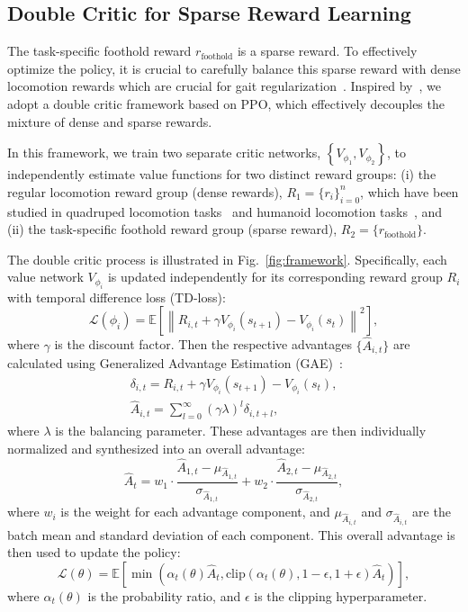\subsection{Double Critic for Sparse Reward Learning}
\label{sec:method_doublecritic}

The task-specific foothold reward $r_\text{foothold}$ is a sparse reward. To effectively optimize the policy, it is crucial to carefully balance this sparse reward with dense locomotion rewards which are crucial for gait regularization~\cite{zargarbashi2024robotkeyframing}. Inspired by~\cite{huang2022reward, xu2023composite, zargarbashi2024robotkeyframing}, we adopt a double critic framework based on PPO, which effectively decouples the mixture of dense and sparse rewards. 

In this framework, we train two separate critic networks, $\left\{V_{\phi_1}, V_{\phi_2}\right\}$, to independently estimate value functions for two distinct reward groups: (i) the regular locomotion reward group (dense rewards), $R_1=\{r_i\}_{i=0}^n$, which have been studied in quadruped locomotion tasks~\cite{margolis2023walk} and humanoid locomotion tasks~\cite{long2024learninghumanoid}, and (ii) the task-specific foothold reward group (sparse reward), $R_2=\{r_\text{foothold}\}$.

The double critic process is illustrated in Fig.~\ref{fig:framework}. Specifically, each value network $V_{\phi_i}$ is updated independently for its corresponding reward group $R_i$ with temporal difference loss (TD-loss):
\begin{equation}
    \mathcal{L}(\phi_i)=\mathbb{E} \left[ \left\| R_{i, t} + \gamma V_{\phi_i}(s_{t+1}) - V_{\phi_i}(s_t) \right\|^2 \right],
\end{equation}
where $\gamma$ is the discount factor. Then the respective advantages $\{\hat{A}_{i, t}\}$ are calculated using Generalized Advantage Estimation (GAE)~\cite{schulman2015high}:
\begin{gather}
    \delta_{i, t} = R_{i, t} + \gamma V_{\phi_i}(s_{t+1}) - V_{\phi_i}(s_t), \\
    \hat{A}_{i, t} = \sum_{l=0}^{\infty} (\gamma \lambda)^l \delta_{i, t+l},
\end{gather}
where $\lambda$ is the balancing parameter. These advantages are then individually normalized and synthesized into an overall advantage:
\begin{equation}
   \hat{A}_t = w_1 \cdot \frac{\hat{A}_{1, t} - \mu_{\hat{A}_{1, t}}}{\sigma_{\hat{A}_{1, t}}} + w_2 \cdot \frac{\hat{A}_{2, t} - \mu_{\hat{A}_{2, t}}}{\sigma_{\hat{A}_{2, t}}} ,
\end{equation}
where $w_i$ is the weight for each advantage component, and $\mu_{\hat{A}_{i, t}}$ and $\sigma_{\hat{A}_{i, t}}$ are the batch mean and standard deviation of each component. This overall advantage is then used to update the policy:
\begin{equation}
    \mathcal{L}(\theta) = \mathbb{E} \left[ \min \left( \alpha_t (\theta)\hat{A}_t, \text{clip}(\alpha_t(\theta), 1-\epsilon, 1+\epsilon)\hat{A}_t \right) \right],
\end{equation}
where $\alpha_t(\theta)$ is the probability ratio, and $\epsilon$ is the clipping hyperparameter.

